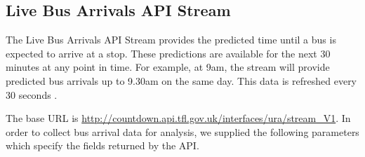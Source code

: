 \subsection{Live Bus Arrivals API Stream}
\par The Live Bus Arrivals API Stream provides the predicted time until a bus is expected to arrive at a stop. These predictions are available for the next 30 minutes at any point in time. For example, at 9am, the stream will provide predicted bus arrivals up to 9.30am on the same day. This data is refreshed every 30 seconds \cite{live_bus_api_documentation}.

\par The base URL is \url{http://countdown.api.tfl.gov.uk/interfaces/ura/stream_V1}. In order to collect bus arrival data for analysis, we supplied the following parameters which specify the fields returned by the API.


